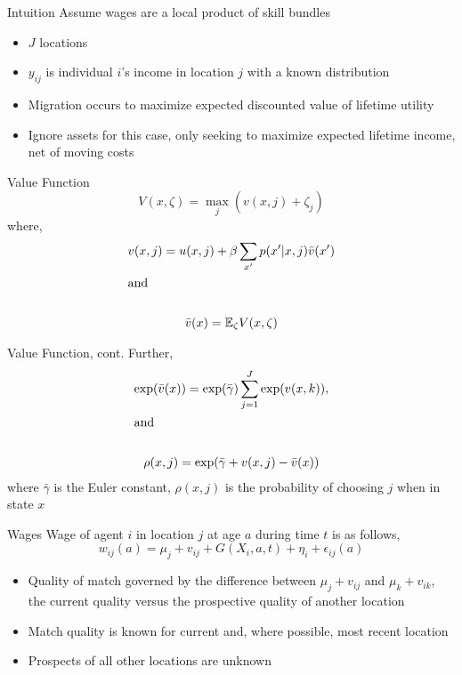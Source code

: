 \documentclass[aspectratio=169,professionalfonts]{beamer}
\begin{document}
\begin{frame}{Intuition}
  Assume wages are a local product of skill bundles
  \begin{itemize}{Environment}
    \item $J$ locations
    \item $y_{ij}$ is individual $i$'s income in location $j$ with a known distribution
    \item Migration occurs to maximize expected discounted value of lifetime utility
    \item Ignore assets for this case, only seeking to maximize expected lifetime income, net of moving costs
  \end{itemize}
\end{frame}

\begin{frame}{Value Function}
  \begin{equation}
    V(x, \zeta) = \max_j(v(x,j) + \zeta_j)
  \end{equation}
  where,
  \begin{gather*}
    v(x,j) = u(x,j) + \beta\sum_{x'}p(x'|x,j)\bar{v}(x') \\
    \shortintertext{and} \\
    \bar{v}(x) = \mathbb{E}_{\zeta}V(x,\zeta)
  \end{gather*}
\end{frame}

\begin{frame}{Value Function, cont.}
  Further,
  \begin{gather*}
    \exp(\bar{v}(x)) = \exp(\bar{\gamma})\sum\limits_{j=1}^J\exp(v(x,k)), \\
    \shortintertext{and} \\
    \rho(x,j) = \exp(\bar{\gamma}+v(x,j)-\bar{v}(x))
  \end{gather*}
  where $\bar{\gamma}$ is the Euler constant, $\rho(x,j)$ is the probability of choosing $j$ when in state $x$
\end{frame}

\begin{frame}{Wages}
  Wage of agent $i$ in location $j$ at age $a$ during time $t$ is as follows,
  \begin{equation}
    w_{ij}(a) = \mu_j + v_{ij} + G(X_i, a, t) + \eta_i + \epsilon_{ij}(a)
  \end{equation}
  \begin{itemize}
  \item Quality of match governed by the difference between $\mu_j + v_{ij}$ and $\mu_k + v_{ik}$, the current quality versus the prospective quality of another location
  \item Match quality is known for current and, where possible, most recent location
  \item Prospects of all other locations are unknown
  \end{itemize}
\end{frame}
\end{document}
